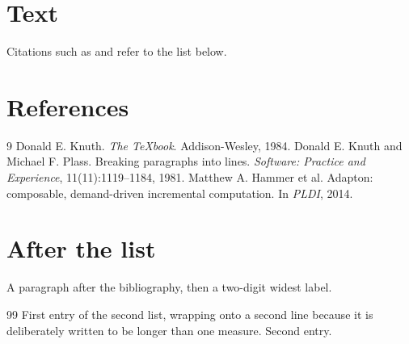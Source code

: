 \documentclass[12pt]{article}
\begin{document}
\section{Text}
Citations such as \cite{knuth84} and \cite{plass81} refer to the list below.

\section*{References}
\begin{thebibliography}{9}
 Donald E. Knuth. \emph{The \TeX book}. Addison-Wesley, 1984.
 Donald E. Knuth and Michael F. Plass. Breaking paragraphs
  into lines. \emph{Software: Practice and Experience}, 11(11):1119--1184, 1981.
 Matthew A. Hammer et al. Adapton: composable,
  demand-driven incremental computation. In \emph{PLDI}, 2014.
\end{thebibliography}

\section{After the list}
A paragraph after the bibliography, then a two-digit widest label.
\begin{thebibliography}{99}
 First entry of the second list, wrapping onto a second line
  because it is deliberately written to be longer than one measure.
 Second entry.
\end{thebibliography}
\end{document}
